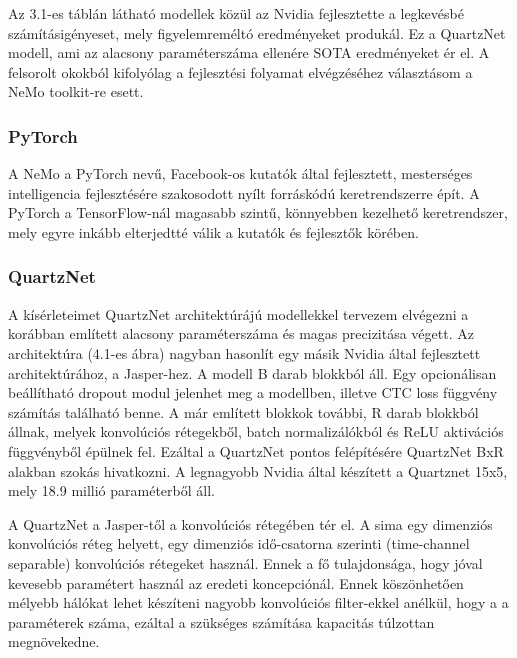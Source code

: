 Az 3.1-es táblán látható modellek közül az Nvidia fejlesztette a legkevésbé számításigényeset, mely figyelemreméltó eredményeket produkál. Ez a QuartzNet modell, ami az alacsony paraméterszáma ellenére SOTA eredményeket ér el. A felsorolt okokból kifolyólag a fejlesztési folyamat elvégzéséhez választásom a NeMo toolkit-re esett.

\subsubsection{PyTorch}

A NeMo a PyTorch nevű, Facebook-os kutatók által fejlesztett, mesterséges intelligencia fejlesztésére szakosodott nyílt forráskódú keretrendszerre épít. A PyTorch a TensorFlow-nál magasabb szintű, könnyebben kezelhető keretrendszer, mely egyre inkább elterjedtté válik a kutatók és fejlesztők körében.

\subsubsection{QuartzNet}

A kísérleteimet QuartzNet architektúrájú modellekkel tervezem elvégezni a korábban említett alacsony paraméterszáma és magas precizitása végett. Az architektúra (4.1-es ábra) nagyban hasonlít egy másik Nvidia által fejlesztett architektúrához, a Jasper-hez. A modell B darab blokkból áll. Egy opcionálisan beállítható dropout modul jelenhet meg a modellben, illetve CTC loss függvény számítás található benne. A már említett blokkok további, R darab blokkból állnak, melyek konvolúciós rétegekből, batch normalizálókból és ReLU aktivációs függvényből épülnek fel. Ezáltal a QuartzNet pontos felépítésére QuartzNet BxR alakban szokás hivatkozni. A legnagyobb Nvidia által készített a Quartznet 15x5, mely 18.9 millió paraméterből áll.

A QuartzNet a Jasper-től a konvolúciós rétegében tér el. A sima egy dimenziós konvolúciós réteg helyett, egy dimenziós idő-csatorna szerinti (time-channel separable) konvolúciós rétegeket használ. Ennek a fő tulajdonsága, hogy jóval kevesebb paramétert használ az eredeti koncepciónál. Ennek köszönhetően mélyebb hálókat lehet készíteni nagyobb konvolúciós filter-ekkel anélkül, hogy a a paraméterek száma, ezáltal a szükséges számítása kapacitás túlzottan megnövekedne.


